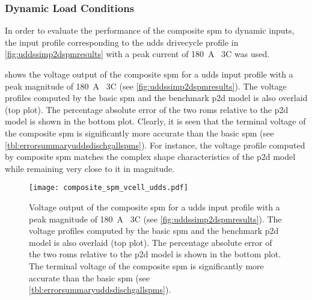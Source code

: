 \subsubsection*{Dynamic Load Conditions}

In  order to  evaluate the  performance of  the composite  \gls{spm} to  dynamic
inputs, the  input profile  corresponding to  the \gls{udds}  drivecycle profile
in \cref{fig:uddssimp2dspmresults}  with  a  peak current  of  \SI{180}{\ampere}
\ie~3C was used.

  shows  the  voltage  output  of  the
composite  \gls{spm}  for a  \gls{udds}  input  profile  with a  peak  magnitude
of   \SI{180}{\ampere}  \ie~3C  (see \cref{fig:uddssimp2dspmresults}).   The
voltage   profiles  computed   by  the   basic  \gls{spm}   and  the   benchmark
\gls{p2d}  model   is  also  overlaid   (top  plot).  The   percentage  absolute
error  of  the  two  \glspl{rom}  relative  to  the  \gls{p2d}  model  is  shown
in  the  bottom  plot.  Clearly,  it  is  seen  that  the  terminal  voltage  of
the  composite  \gls{spm}   is  significantly  more  accurate   than  the  basic
\gls{spm}  (see \cref{tbl:errorsummaryuddsdischgallspms}).   For  instance,  the
voltage  profile  computed by  composite  \gls{spm}  matches the  complex  shape
characteristics  of the  \gls{p2d} model  while remaining  very close  to it  in
magnitude.

\begin{figure}[!htbp]
    \centering
    \texttt{[image: composite\_spm\_vcell\_udds.pdf]}
    \caption[%
    Terminal voltage output of --- \emph{a}) the  model, \emph{b}) the
    basic , and \emph{c}) the composite  for a
     input profile
    ]%
    {%
        Voltage output of the composite \gls{spm} for a \gls{udds} input profile
        with a peak magnitude of \SI{180}{\ampere} \ie~3C
        (see \cref{fig:uddssimp2dspmresults}). The voltage
        profiles computed by the basic \gls{spm} and the benchmark \gls{p2d}
        model is also overlaid (top plot). The percentage absolute error of the
        two \glspl{rom} relative to the \gls{p2d} model is shown in the bottom
        plot. The terminal voltage of the composite \gls{spm} is significantly
        more accurate than the basic \gls{spm}
        (see \cref{tbl:errorsummaryuddsdischgallspms}).
    }%
    \label{fig:voltageoutputcompareallSPMsudds}
\end{figure}

